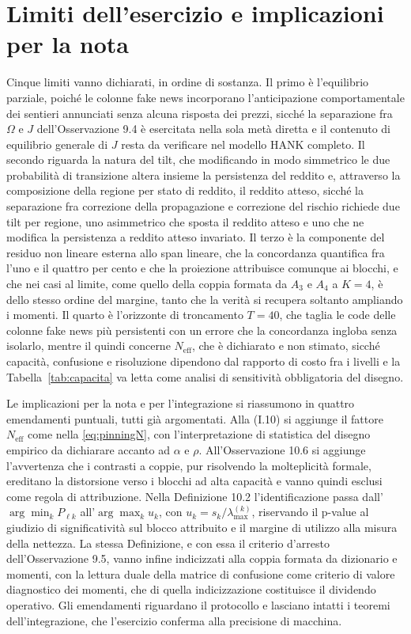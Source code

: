 \documentclass[11pt,a4paper]{article}
\newcommand{\Neff}{N_{\mathrm{eff}}}
\begin{document}
\section{Limiti dell'esercizio e implicazioni per la nota}\label{sec:limiti}
Cinque limiti vanno dichiarati, in ordine di sostanza. Il primo \`e l'equilibrio parziale, poich\'e le colonne fake news incorporano l'anticipazione comportamentale dei sentieri annunciati senza alcuna risposta dei prezzi, sicch\'e la separazione fra $\Omega$ e $J$ dell'Osservazione 9.4 \`e esercitata nella sola met\`a diretta e il contenuto di equilibrio generale di $J$ resta da verificare nel modello HANK completo. Il secondo riguarda la natura del tilt, che modificando in modo simmetrico le due probabilit\`a di transizione altera insieme la persistenza del reddito e, attraverso la composizione della regione per stato di reddito, il reddito atteso, sicch\'e la separazione fra correzione della propagazione e correzione del rischio richiede due tilt per regione, uno asimmetrico che sposta il reddito atteso e uno che ne modifica la persistenza a reddito atteso invariato. Il terzo \`e la componente del residuo non lineare esterna allo span lineare, che la concordanza quantifica fra l'uno e il quattro per cento e che la proiezione attribuisce comunque ai blocchi, e che nei casi al limite, come quello della coppia formata da $A_3$ e $A_4$ a $K=4$, \`e dello stesso ordine del margine, tanto che la verit\`a si recupera soltanto ampliando i momenti. Il quarto \`e l'orizzonte di troncamento $T=40$, che taglia le code delle colonne fake news pi\`u persistenti con un errore che la concordanza ingloba senza isolarlo, mentre il quindi concerne $\Neff$, che \`e dichiarato e non stimato, sicch\'e capacit\`a, confusione e risoluzione dipendono dal rapporto di costo fra i livelli e la Tabella~\ref{tab:capacita} va letta come analisi di sensitivit\`a obbligatoria del disegno.

Le implicazioni per la nota e per l'integrazione si riassumono in quattro emendamenti puntuali, tutti gi\`a argomentati. Alla (I.10) si aggiunge il fattore $\Neff$ come nella \eqref{eq:pinningN}, con l'interpretazione di statistica del disegno empirico da dichiarare accanto ad $\alpha$ e $\rho$. All'Osservazione 10.6 si aggiunge l'avvertenza che i contrasti a coppie, pur risolvendo la molteplicit\`a formale, ereditano la distorsione verso i blocchi ad alta capacit\`a e vanno quindi esclusi come regola di attribuzione. Nella Definizione 10.2 l'identificazione passa dall'$\arg\min_k P_{\ell k}$ all'$\arg\max_k u_k$, con $u_k=s_k/\lambda_{\max}^{(k)}$, riservando il p-value al giudizio di significativit\`a sul blocco attribuito e il margine di utilizzo alla misura della nettezza. La stessa Definizione, e con essa il criterio d'arresto dell'Osservazione 9.5, vanno infine indicizzati alla coppia formata da dizionario e momenti, con la lettura duale della matrice di confusione come criterio di valore diagnostico dei momenti, che di quella indicizzazione costituisce il dividendo operativo. Gli emendamenti riguardano il protocollo e lasciano intatti i teoremi dell'integrazione, che l'esercizio conferma alla precisione di macchina.
\end{document}
